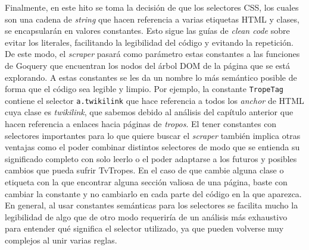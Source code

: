 Finalmente, en este hito se toma la decisión de que los selectores CSS, los
cuales son una cadena de \textit{string} que hacen referencia a varias etiquetas
HTML y clases, se encapsularán en valores constantes. Esto sigue las guías de
\textit{clean code} sobre evitar los literales, facilitando la legibilidad del
código y evitando la repetición. De este modo, el \textit{scraper} pasará como
parámetro estas constantes a las funciones de Goquery que encuentran los nodos
del árbol DOM de la página que se está explorando. A estas constantes se les da
un nombre lo más semántico posible de forma que el código sea legible y limpio.
Por ejemplo, la constante \texttt{TropeTag} contiene el selector \texttt{a.twikilink} que hace referencia a todos los \textit{anchor} de HTML
cuya clase es \textit{twikilink}, que sabemos debido al análisis del capítulo
anterior que hacen referencia a enlaces hacia páginas de \textit{tropos}. El
tener constantes con selectores importantes para lo que quiere buscar el
\textit{scraper} también implica otras ventajas como el poder combinar distintos
selectores de modo que se entienda su significado completo con solo leerlo o el
poder adaptarse a los futuros y posibles cambios que pueda sufrir TvTropes. En
el caso de que cambie alguna clase o etiqueta con la que encontrar alguna
sección valiosa de una página, baste con cambiar la constante y no cambiarlo en
cada parte del código en la que aparezca. En general, al usar constantes
semánticas para los selectores se facilita mucho la legibilidad de algo que de
otro modo requeriría de un análisis más exhaustivo para entender qué significa
el selector utilizado, ya que pueden volverse muy complejos al unir varias
reglas.

